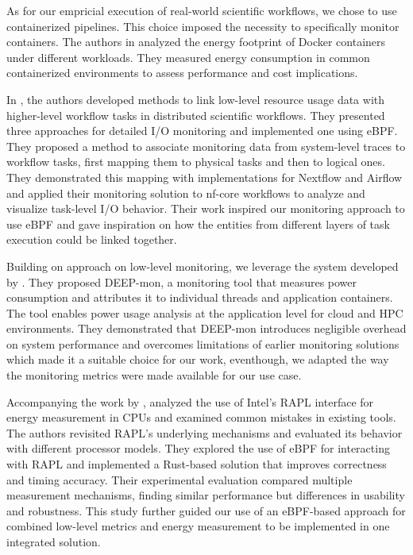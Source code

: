 As for our empricial execution of real-world scientific workflows, we chose to use containerized pipelines. This choice imposed the necessity to specifically monitor containers. The authors in \cite{10197087} analyzed the energy footprint of Docker containers under different workloads. They measured energy consumption in common containerized environments to assess performance and cost implications.

In \cite{Witzke2024}, the authors developed methods to link low-level resource usage data with higher-level workflow tasks in distributed scientific workflows. They presented three approaches for detailed I/O monitoring and implemented one using eBPF. They proposed a method to associate monitoring data from system-level traces to workflow tasks, first mapping them to physical tasks and then to logical ones. They demonstrated this mapping with implementations for Nextflow and Airflow and applied their monitoring solution to nf-core workflows to analyze and visualize task-level I/O behavior. Their work inspired our monitoring approach to use eBPF and gave inspiration on how the entities from different layers of task execution could be linked together.

Building on \cite{Witzke2024} approach on low-level monitoring, we leverage the system developed by \cite{8425477}. They proposed DEEP-mon, a monitoring tool that measures power consumption and attributes it to individual threads and application containers. The tool enables power usage analysis at the application level for cloud and HPC environments. They demonstrated that DEEP-mon introduces negligible overhead on system performance and overcomes limitations of earlier monitoring solutions which made it a suitable choice for our work, eventhough, we adapted the way the monitoring metrics were made available for our use case.

Accompanying the work by \cite{8425477}, \cite{Raffin2024} analyzed the use of Intel's RAPL interface for energy measurement in CPUs and examined common mistakes in existing tools. The authors revisited RAPL's underlying mechanisms and evaluated its behavior with different processor models. They explored the use of eBPF for interacting with RAPL and implemented a Rust-based solution that improves correctness and timing accuracy. Their experimental evaluation compared multiple measurement mechanisms, finding similar performance but differences in usability and robustness. This study further guided our use of an eBPF-based approach for combined low-level metrics and energy measurement to be implemented in one integrated solution.

